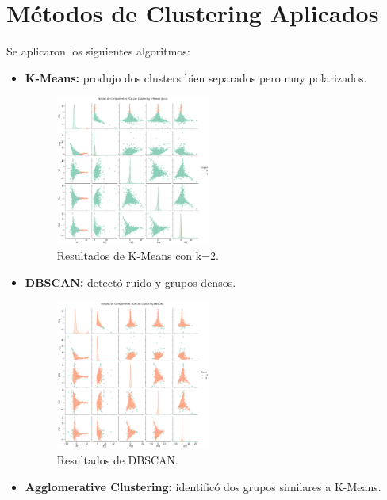 \documentclass[conference]{IEEEtran}
\begin{document}
\section{Métodos de Clustering Aplicados}
Se aplicaron los siguientes algoritmos:

\begin{itemize}
    \item \textbf{K-Means:} produjo dos clusters bien separados pero muy polarizados.
        \begin{figure}[htbp]
            \centering
            \includegraphics[width=0.48\textwidth]{images/k_means.png}
            \caption{Resultados de K-Means con k=2.}
            \label{fig:kmeans}
        \end{figure}
    \item \textbf{DBSCAN:} detectó ruido y grupos densos.
        \begin{figure}[htbp]
            \centering
            \includegraphics[width=0.48\textwidth]{images/dbscan.png}
            \caption{Resultados de DBSCAN.}
            \label{fig:dbscan}
        \end{figure}
    \item \textbf{Agglomerative Clustering:} identificó dos grupos similares a K-Means.
        \begin{figure}[htbp]
            \centering

\end{figure}
\end{itemize}
\end{document}
